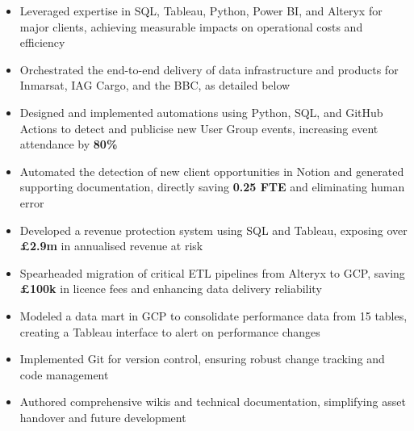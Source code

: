 \begin{paracol}{2}

\begin{itemize}
\item Leveraged expertise in SQL, Tableau, Python, Power BI, and Alteryx for major clients, achieving measurable impacts on operational costs and efficiency
\item Orchestrated the end-to-end delivery of data infrastructure and products for Inmarsat, IAG Cargo, and the BBC, as detailed below
\item Designed and implemented automations using Python, SQL, and GitHub Actions to detect and publicise new User Group events, increasing event attendance by \textbf{80\%}
\item Automated the detection of new client opportunities in Notion and generated supporting documentation, directly saving \textbf{0.25 FTE} and eliminating human error

\medskip
{}

\end{itemize}

\divider

\begin{itemize}
\item Developed a revenue protection system using SQL and Tableau, exposing over \textbf{£2.9m} in annualised revenue at risk
\item Spearheaded migration of critical ETL pipelines from Alteryx to GCP, saving \textbf{£100k} in licence fees and enhancing data delivery reliability
\item Modeled a data mart in GCP to consolidate performance data from 15 tables, creating a Tableau interface to alert on performance changes
\item Implemented Git for version control, ensuring robust change tracking and code management
\item Authored comprehensive wikis and technical documentation, simplifying asset handover and future development


\end{itemize}
\end{paracol}

